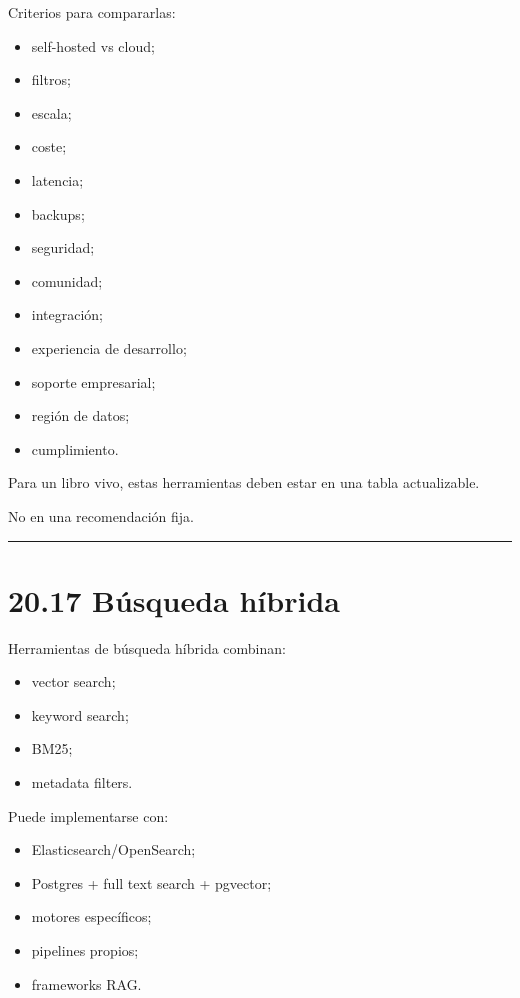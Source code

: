 Criterios para compararlas:

\begin{itemize}
\tightlist
\item
  self-hosted vs cloud;
\item
  filtros;
\item
  escala;
\item
  coste;
\item
  latencia;
\item
  backups;
\item
  seguridad;
\item
  comunidad;
\item
  integración;
\item
  experiencia de desarrollo;
\item
  soporte empresarial;
\item
  región de datos;
\item
  cumplimiento.
\end{itemize}

Para un libro vivo, estas herramientas deben estar en una tabla
actualizable.

No en una recomendación fija.

\begin{center}\rule{0.5\linewidth}{0.5pt}\end{center}

\section{20.17 Búsqueda híbrida}\label{buxfasqueda-huxedbrida-1}

Herramientas de búsqueda híbrida combinan:

\begin{itemize}
\tightlist
\item
  vector search;
\item
  keyword search;
\item
  BM25;
\item
  metadata filters.
\end{itemize}

Puede implementarse con:

\begin{itemize}
\tightlist
\item
  Elasticsearch/OpenSearch;
\item
  Postgres + full text search + pgvector;
\item
  motores específicos;
\item
  pipelines propios;
\item
  frameworks RAG.
\end{itemize}

